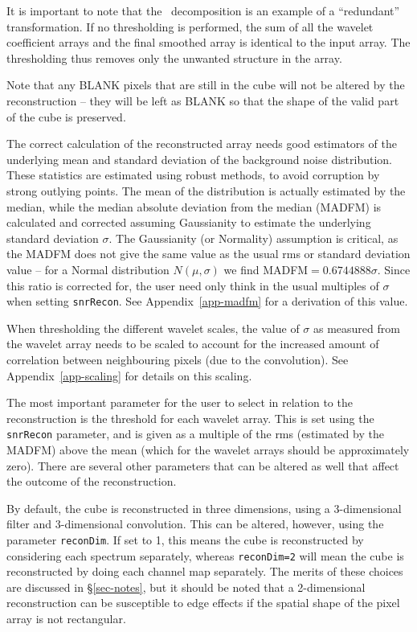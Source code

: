 It is important to note that the \atrous\ decomposition is an example
of a ``redundant'' transformation. If no thresholding is performed,
the sum of all the wavelet coefficient arrays and the final smoothed
array is identical to the input array. The thresholding thus removes
only the unwanted structure in the array.

Note that any BLANK pixels that are still in the cube will not be
altered by the reconstruction -- they will be left as BLANK so that
the shape of the valid part of the cube is preserved.


The correct calculation of the reconstructed array needs good
estimators of the underlying mean and standard deviation of the
background noise distribution. These statistics are estimated using
robust methods, to avoid corruption by strong outlying points. The
mean of the distribution is actually estimated by the median, while
the median absolute deviation from the median (MADFM) is calculated
and corrected assuming Gaussianity to estimate the underlying standard
deviation $\sigma$. The Gaussianity (or Normality) assumption is
critical, as the MADFM does not give the same value as the usual rms
or standard deviation value -- for a Normal distribution
$N(\mu,\sigma)$ we find MADFM$=0.6744888\sigma$. Since this ratio is
corrected for, the user need only think in the usual multiples of
$\sigma$ when setting \texttt{snrRecon}. See Appendix~\ref{app-madfm}
for a derivation of this value.

When thresholding the different wavelet scales, the value of $\sigma$
as measured from the wavelet array needs to be scaled to account for
the increased amount of correlation between neighbouring pixels (due
to the convolution). See Appendix~\ref{app-scaling} for details on
this scaling.


The most important parameter for the user to select in relation to the
reconstruction is the threshold for each wavelet array. This is set
using the \texttt{snrRecon} parameter, and is given as a multiple of
the rms (estimated by the MADFM) above the mean (which for the wavelet
arrays should be approximately zero). There are several other
parameters that can be altered as well that affect the outcome of the
reconstruction.

By default, the cube is reconstructed in three dimensions, using a
3-dimensional filter and 3-dimensional convolution. This can be
altered, however, using the parameter \texttt{reconDim}. If set to 1,
this means the cube is reconstructed by considering each spectrum
separately, whereas \texttt{reconDim=2} will mean the cube is
reconstructed by doing each channel map separately. The merits of
these choices are discussed in \S\ref{sec-notes}, but it should be
noted that a 2-dimensional reconstruction can be susceptible to edge
effects if the spatial shape of the pixel array is not rectangular.

